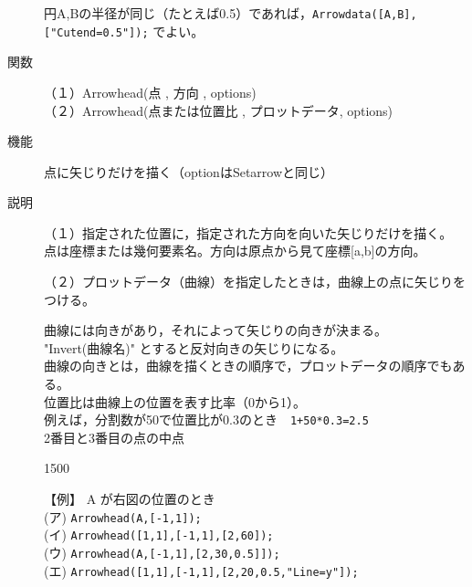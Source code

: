 \documentclass[papersize,a4paper,12pt,uplatex]{jsarticle}
\begin{document}
\begin{description}
円A,Bの半径が同じ（たとえば0.5）であれば，\verb|Arrowdata([A,B],["Cutend=0.5"]);| でよい。

\vspace{\baselineskip}
\hypertarget{arrowhead}{}
\item[関数]（１）Arrowhead(点 , 方向 , options)\\
（２）Arrowhead(点または位置比 , プロットデータ, options)
\item[機能]点に矢じりだけを描く（optionはSetarrowと同じ）
\item[説明]（１）指定された位置に，指定された方向を向いた矢じりだけを描く。\\
\hspace*{2.5zw}点は座標または幾何要素名。方向は原点から見て座標[a,b]の方向。


（２）プロットデータ（曲線）を指定したときは，曲線上の点に矢じりをつける。

\hspace*{2.5zw}曲線には向きがあり，それによって矢じりの向きが決まる。\\
\hspace*{2.5zw}"Invert(曲線名)" とすると反対向きの矢じりになる。\\
\hspace*{2.5zw}曲線の向きとは，曲線を描くときの順序で，プロットデータの順序でもある。\\
\hspace*{2.5zw}位置比は曲線上の位置を表す比率（0から1）。\\
\hspace*{3.5zw}例えば，分割数が50で位置比が0.3のとき　\verb|1+50*0.3=2.5|\\
\hspace*{4.5zw}2番目と3番目の点の中点

\vspace{0.5zw}

\begin{layer}{150}{0}
\end{layer}

【例】 A が右図の位置のとき\\
\hspace*{2.5zw}(ア) \verb|Arrowhead(A,[-1,1]);|\\
\hspace*{2.5zw}(イ) \verb|Arrowhead([1,1],[-1,1],[2,60]);|\\
\hspace*{2.5zw}(ウ) \verb|Arrowhead(A,[-1,1],[2,30,0.5]]);|\\
\hspace*{2.5zw}(エ) \verb|Arrowhead([1,1],[-1,1],[2,20,0.5,"Line=y"]);|


\end{description}
\end{document}

